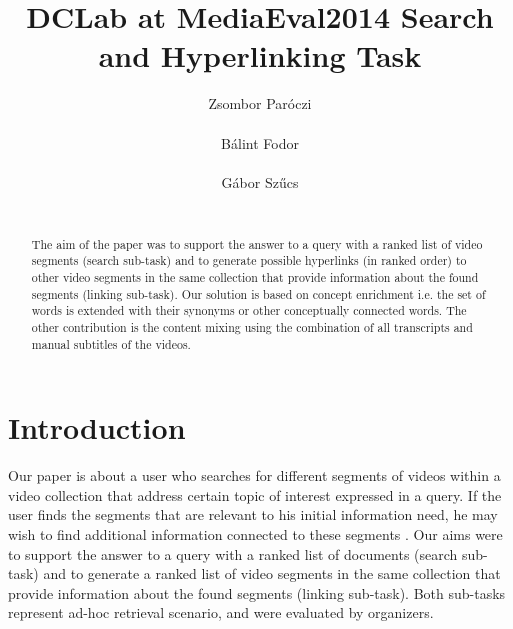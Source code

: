 \documentclass{acm_proc_article-me}
\begin{document}

\title{DCLab at MediaEval2014 Search and Hyperlinking Task}


\author{
\alignauthor
Zsombor Par\'oczi\\
       \\
\alignauthor
B\'alint Fodor\\
       \\
\alignauthor
G\'abor Sz\H ucs \\
       \\
}

\maketitle
\begin{abstract}
The aim of the paper was to support the answer to a query with a ranked list of video segments (search sub-task) and to generate possible hyperlinks (in ranked order) to other video segments in the same collection that provide information about the found segments (linking sub-task). Our solution is based on concept enrichment i.e. the set of words is extended with their synonyms or other conceptually connected words. The other contribution is the content mixing using the combination of all transcripts and manual subtitles of the videos.
\end{abstract}

\section{Introduction}
Our paper is about a user who searches for different segments of videos within a video collection that address certain topic of interest expressed in a query. If the user finds the segments that are relevant to his initial information need, he may wish to find additional information connected to these segments \cite{eskevich2014search}. Our aims were to support the answer to a query with a ranked list of documents (search sub-task) and to generate a ranked list of video segments in the same collection that provide information about the found segments (linking sub-task). Both sub-tasks represent ad-hoc retrieval scenario, and were evaluated by organizers.
\end{document}
